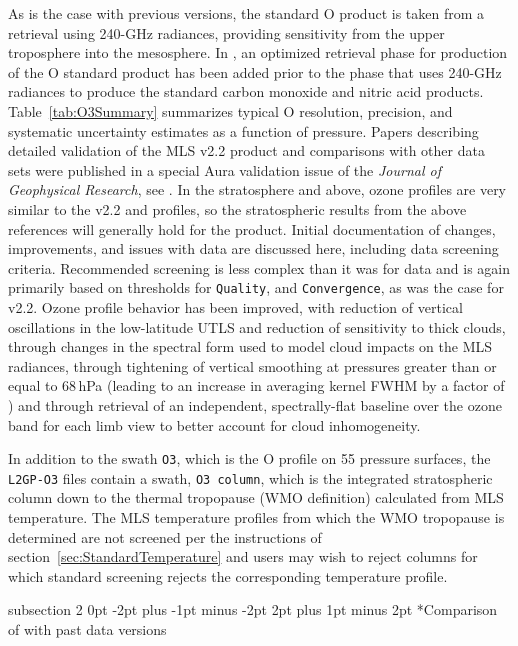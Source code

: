 \documentclass[11pt,draft]{report}
\makeatletter
\renewcommand{\subsection}{\@startsection%
  {subsection}%
  {2}%
  {0pt}%
  {-2pt plus -1pt minus -2pt}%
  {2pt plus 1pt minus 2pt}%
  {\large\sffamily\fontseries{sb}\selectfont\flushleft\color{SectionColor}\figureversion{tabular}}}%
\makeatother
\begin{document}
As is the case with previous versions, the \thisv standard O
product is taken from a retrieval using 240-GHz radiances, 
providing sensitivity from the upper troposphere into the mesosphere.
In \thisv, an optimized retrieval phase for production of the O
standard product has been added prior to the phase that uses
240-GHz radiances to produce the standard  carbon monoxide and nitric 
acid products.  Table~\ref{tab:O3Summary}
summarizes typical O resolution, precision, and systematic uncertainty
estimates as a function of pressure.  Papers describing detailed
validation of the MLS v2.2 product and comparisons with other data sets
were published in a special Aura validation issue of the {\it Journal of
  Geophysical Research}, see
\citep{FroidevauxEtal08O3,JiangYEtal07,LiveseyEtal08}.  In the
stratosphere and above, \thisv ozone profiles are very similar to the
v2.2 and \prevvSlash profiles, so the stratospheric results from the
above references will generally hold for the product.  Initial
documentation of changes, improvements, and issues with \thisv data are
discussed here, including data screening criteria.  Recommended
screening is less complex than it was for \prevvSlash data and is again
primarily based on thresholds for \texttt{Quality}, and
\texttt{Convergence}, as was the case for v2.2.  Ozone profile behavior
has been improved, with reduction of vertical oscillations in the
low-latitude UTLS and reduction of sensitivity to thick clouds, 
through changes in the spectral form used to model cloud impacts on the
MLS radiances, through tightening of vertical smoothing at pressures greater
than or equal to 68\,hPa (leading to an increase in averaging kernel
FWHM by a factor of ) and through retrieval of an independent,
spectrally-flat baseline over the ozone band for each limb view to
better account for cloud inhomogeneity.

 
In addition to the swath \texttt{O3}, which is the O profile on 55
pressure surfaces, the \texttt{L2GP-O3} files contain a swath,
\texttt{O3~column}, which is the integrated stratospheric column down to
the thermal tropopause (WMO definition) calculated from MLS temperature.
The MLS temperature profiles from which the WMO tropopause is determined 
are not screened per the instructions of section~\ref{sec:StandardTemperature} 
and users may wish to reject columns for which standard screening rejects 
the corresponding temperature profile.

\subsection*{Comparison of \thisv with past data versions}  
\end{document}
